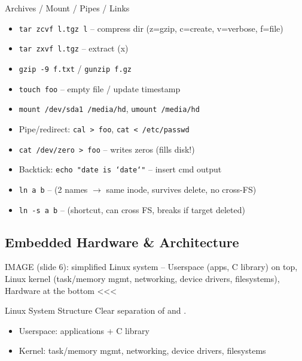 \multend

\begin{definition}{Archives / Mount / Pipes / Links}
    \begin{itemize}
        \item \texttt{tar zcvf l.tgz l} -- compress dir (z=gzip, c=create, v=verbose, f=file)
        \item \texttt{tar zxvf l.tgz} -- extract (x)
        \item \texttt{gzip -9 f.txt} / \texttt{gunzip f.gz}
        \item \texttt{touch foo} -- empty file / update timestamp
        \item \texttt{mount /dev/sda1 /media/hd}, \texttt{umount /media/hd}
    \end{itemize}
    \begin{itemize}
        \item Pipe/redirect: \texttt{cal > foo}, \texttt{cat < /etc/passwd}
        \item \texttt{cat /dev/zero > foo} -- writes zeros (fills disk!)
        \item Backtick: \texttt{echo "date is `date`"} -- insert cmd output
        \item \texttt{ln a b} --  (2 names $\to$ same inode, survives delete, no cross-FS)
        \item \texttt{ln -s a b} --  (shortcut, can cross FS, breaks if target deleted)
    \end{itemize}
    \multend
\end{definition}

\subsection{Embedded Hardware \& Architecture}

IMAGE (slide 6): simplified Linux system -- Userspace (apps, C library) on top, Linux kernel (task/memory mgmt, networking, device drivers, filesystems), Hardware at the bottom <<<




\begin{concept}{Linux System Structure}
    Clear separation of  and .
    \begin{itemize}
        \item Userspace: applications + C library
        \item Kernel: task/memory mgmt, networking, device drivers, filesystems
    \end{itemize}
\end{concept}

